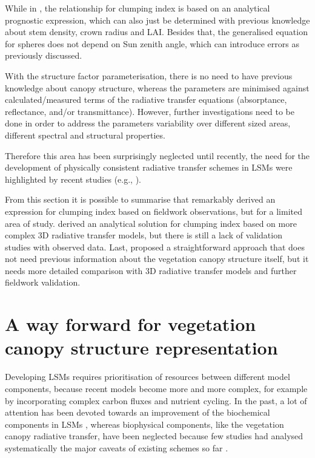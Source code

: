 While in \citet{Ni-Meister2010},  the relationship for clumping index is based on an analytical prognostic expression, which can also just be determined with previous knowledge about stem density, crown radius and LAI. Besides that, the generalised equation for spheres does not depend on Sun zenith angle, which can introduce errors as previously discussed. 

With the structure factor parameterisation, there is no need to have previous knowledge about canopy structure, whereas the parameters are minimised against calculated/measured terms of the radiative transfer equations (absorptance, reflectance, and/or transmittance). However, further investigations need to be done in order to address the parameters variability over different sized areas, different spectral and structural properties.

Therefore this area has been surprisingly neglected until recently, the need for the development of physically consistent radiative transfer schemes in LSMs were highlighted by recent studies (e.g., \citet{Widlowski2011,loew2014}). 

From this section it is possible to summarise that \citet{Kucharik1999} remarkably derived an expression for clumping index based on fieldwork observations, but for a limited area of study. \citet{Ni-Meister2010} derived an analytical solution for clumping index based on more complex 3D radiative transfer models, but there is still a lack of validation studies with observed data. Last, \citet{pinty2006} proposed a straightforward approach that does not need previous information about the vegetation canopy structure itself, but it needs more detailed comparison with 3D radiative transfer models and further fieldwork validation.

\section{A way forward for vegetation canopy structure representation}

Developing LSMs requires prioritisation of resources between different model components, because recent models become more and more complex, for example by incorporating complex carbon fluxes and nutrient cycling. In the past, a lot of attention has been devoted towards an improvement of the biochemical components in LSMs \citep{Goll2012}, whereas biophysical components, like the vegetation canopy radiative transfer, have been neglected because few studies had analysed systematically the major caveats of existing schemes so far \citep{loew2014}. 

